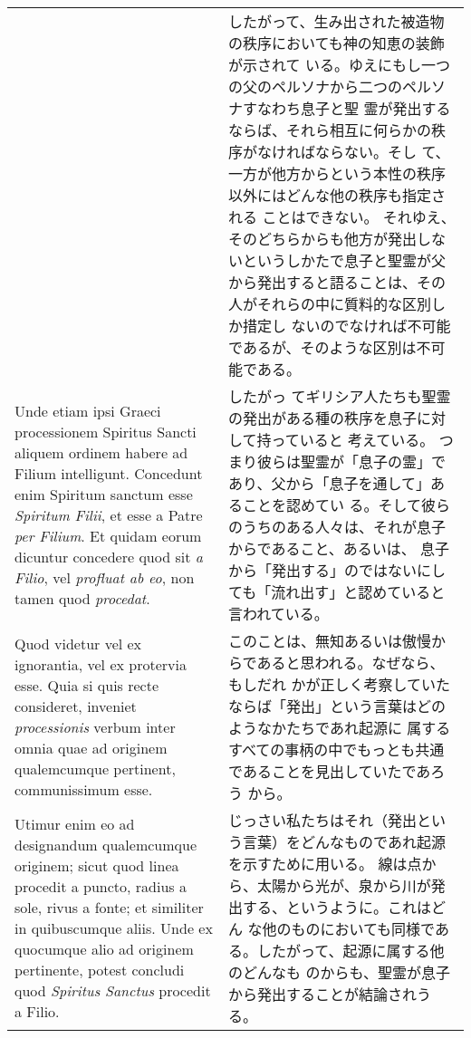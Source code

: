 \documentclass[10pt]{jsarticle} %
\begin{document}
\begin{longtable}{p{21em}p{21em}}
&

したがって、生み出された被造物の秩序においても神の知恵の装飾が示されて
 いる。ゆえにもし一つの父のペルソナから二つのペルソナすなわち息子と聖
 霊が発出するならば、それら相互に何らかの秩序がなければならない。そし
 て、一方が他方からという本性の秩序以外にはどんな他の秩序も指定される
 ことはできない。
それゆえ、そのどちらからも他方が発出しないというしかたで息子と聖霊が父
 から発出すると語ることは、その人がそれらの中に質料的な区別しか措定し
 ないのでなければ不可能であるが、そのような区別は不可能である。

\\


Unde etiam ipsi Graeci processionem  Spiritus Sancti
aliquem ordinem habere ad Filium intelligunt. 
Concedunt enim  Spiritum
sanctum esse  {\itshape Spiritum Filii}, et esse a Patre {\itshape per Filium}. Et quidam
eorum dicuntur concedere quod sit {\itshape a Filio}, vel {\itshape profluat ab eo}, non
tamen quod {\itshape procedat}. 


&

したがっ
 てギリシア人たちも聖霊の発出がある種の秩序を息子に対して持っていると
 考えている。
つまり彼らは聖霊が「息子の霊」であり、父から「息子を通して」あることを認めてい
 る。そして彼らのうちのある人々は、それが息子からであること、あるいは、
 息子から「発出する」のではないにしても「流れ出す」と認めていると言われている。

\\

Quod videtur vel ex ignorantia, vel ex protervia
esse. Quia si quis recte consideret, inveniet {\itshape processionis} verbum
inter omnia quae ad originem qualemcumque pertinent, communissimum
esse. 


&

 このことは、無知あるいは傲慢からであると思われる。なぜなら、もしだれ
 かが正しく考察していたならば「発出」という言葉はどのようなかたちであれ起源に
 属するすべての事柄の中でもっとも共通であることを見出していたであろう
 から。

\\


Utimur enim eo ad designandum qualemcumque originem; sicut quod
linea procedit a puncto, radius a sole, rivus a fonte; et similiter in
quibuscumque aliis. Unde ex quocumque alio ad originem pertinente,
potest concludi quod {\itshape  Spiritus Sanctus} procedit a Filio.

&

じっさい私たちはそれ（発出という言葉）をどんなものであれ起源を示すために用いる。
 線は点から、太陽から光が、泉から川が発出する、というように。これはどん
 な他のものにおいても同様である。したがって、起源に属する他のどんなも
 のからも、聖霊が息子から発出することが結論されうる。


\end{longtable}
\end{document}
